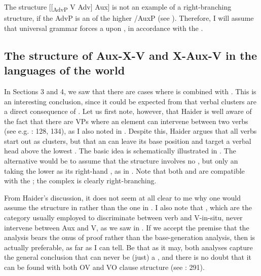 \documentclass[output=paper, colorlinks, citecolor=brown]{langscibook}
\begin{document}
The structure [[\textsubscript{AdvP} V Adv] Aux] is not an example of a right-branching structure, if the AdvP is an  of the higher /AuxP (see \citealt{Haider2013}). Therefore, I will assume that universal grammar forces a  upon , in accordance with the . 


\subsection{The structure of Aux-X-V and X-Aux-V in the languages of the world}\label{sec:sangfelt:5.2}

In Sections 3 and 4, we saw that there are cases where  is combined with . This is an interesting conclusion, since it could be expected from \citet{Haider2010} that verbal clusters are a direct consequence of . Let us first note, however, that Haider is well aware of the fact that there are  VPs where an element can intervene between two verbs (see e.g. \citealt{Haider2013}: 128, 134), as I also noted in . Despite this, Haider argues that all verbs start out as clusters, but that an  can leave its base position and target a verbal head above the lowest  \parencites[290–291]{Haider2010}[134]{Haider2013}. The basic idea is schematically illustrated in . The alternative would be to assume that the structure involves no , but only an  taking the lower  as its right-hand , as in . Note that both  and  are compatible with the ; the complex  is clearly right-branching.

\settowidth{}
\ea
\label{ex:sangfelt:30}
 
 
\z 
\z

From Haider’s discussion, it does not seem at all clear to me why one would assume the structure in  rather than the one in . I also note that , which are the category usually employed to discriminate between verb  and V-in-situ, never intervene between Aux and V, as we saw in . If we accept the premise that the  analysis bears the onus of proof rather than the base-generation analysis, then  is actually preferable, as far as I can tell. Be that as it may, both analyses capture the general conclusion that  can never be (just) a , and there is no doubt that it can be found with both OV and VO clause structure (see \citealt{Haider2010}: 291).
\end{document}
